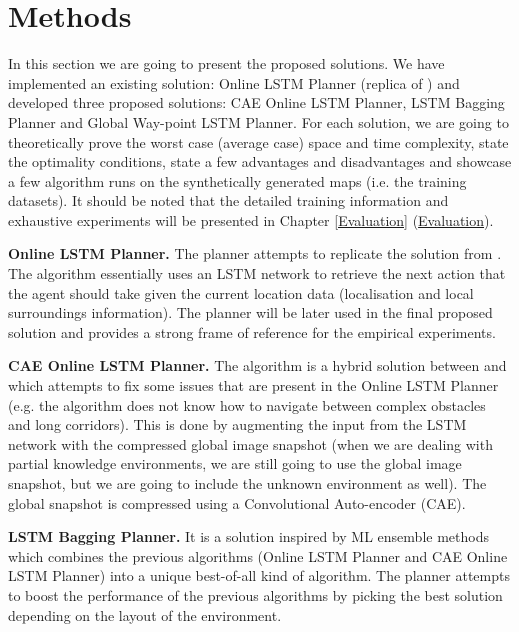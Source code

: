 \chapter{Methods} \label{sec: methods}

In this section we are going to present the proposed solutions. We have implemented an existing solution: Online LSTM Planner (replica of \cite{nicola2018lstm}) and developed three proposed solutions: CAE Online LSTM Planner, LSTM Bagging Planner and Global Way-point LSTM Planner. For each solution, we are going to theoretically prove the worst case (average case) space and time complexity, state the optimality conditions, state a few advantages and disadvantages and showcase a few algorithm runs on the synthetically generated maps (i.e. the training datasets). It should be noted that the detailed training information and exhaustive experiments will be presented in Chapter \ref {Evaluation} (\hyperref[Evaluation]{Evaluation}). %

\textbf{Online LSTM Planner.} The planner attempts to replicate the solution from \cite{nicola2018lstm}. The algorithm essentially uses an LSTM network to retrieve the next action that the agent should take given the current location data (localisation and local surroundings information). The planner will be later used in the final proposed solution and provides a strong frame of reference for the empirical experiments.

\textbf{CAE Online LSTM Planner.} The algorithm is a hybrid solution between \cite{nicola2018lstm} and \cite{inoue2019robot} which attempts to fix some issues that are present in the Online LSTM Planner (e.g. the algorithm does not know how to navigate between complex obstacles and long corridors). This is done by augmenting the input from the LSTM network with the compressed global image snapshot (when we are dealing with partial knowledge environments, we are still going to use the global image snapshot, but we are going to include the unknown environment as well). The global snapshot is compressed using a Convolutional Auto-encoder (CAE).

\textbf{LSTM Bagging Planner.} It is a solution inspired by ML ensemble methods which combines the previous algorithms (Online LSTM Planner and CAE Online LSTM Planner) into a unique best-of-all kind of algorithm. The planner attempts to boost the performance of the previous algorithms by picking the best solution depending on the layout of the environment.

